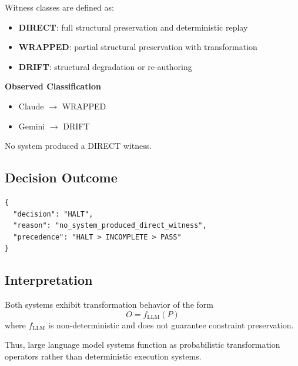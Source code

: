 \documentclass[11pt]{article}
\begin{document}
Witness classes are defined as:

\begin{itemize}
    \item \textbf{DIRECT}: full structural preservation and deterministic replay
    \item \textbf{WRAPPED}: partial structural preservation with transformation
    \item \textbf{DRIFT}: structural degradation or re-authoring
\end{itemize}

\textbf{Observed Classification}

\begin{itemize}
    \item Claude $\rightarrow$ WRAPPED
    \item Gemini $\rightarrow$ DRIFT
\end{itemize}

No system produced a DIRECT witness.

\subsection{Decision Outcome}

\begin{verbatim}
{
  "decision": "HALT",
  "reason": "no_system_produced_direct_witness",
  "precedence": "HALT > INCOMPLETE > PASS"
}
\end{verbatim}

\subsection{Interpretation}

Both systems exhibit transformation behavior of the form
\[
O = f_{\mathrm{LLM}}(P)
\]
where $f_{\mathrm{LLM}}$ is non-deterministic and does not guarantee constraint preservation.

Thus, large language model systems function as probabilistic transformation operators rather than deterministic execution systems.
\end{document}
